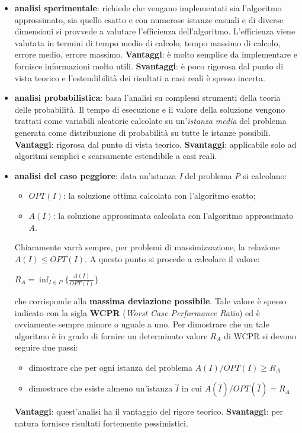 \documentclass[11pt, oneside]{book}
\begin{document}
\begin{itemize}
\item {\bf analisi sperimentale}: richiede che vengano implementati
  sia l'algoritmo approssimato, sia quello esatto e con numerose
  istanze casuali e di diverse dimensioni si provvede a valutare
  l'efficienza dell'algoritmo. L'efficienza viene valutata in termini
  di tempo medio di calcolo, tempo massimo di calcolo, errore medio,
  errore massimo. {\bf Vantaggi}: \`e molto semplice da implementare e
  fornisce informazioni molto utili. {\bf Svantaggi}: \`e poco
  rigorosa dal punto di vista teorico e l'estendibilit\`a dei
  risultati a casi reali \`e spesso incerta.

\item {\bf analisi probabilistica}: basa l'analisi su complessi
  strumenti della teoria delle probabilit\`a. Il tempo di esecuzione e
  il valore della soluzione vengono trattati come variabili aleatorie
  calcolate su un'{\em istanza media} del problema generata come
  distribuzione di probabilit\`a su tutte le istanze possibili. {\bf
    Vantaggi}: rigorosa dal punto di vista teorico. {\bf Svantaggi}:
  applicabile solo ad algoritmi semplici e scarsamente estendibile a
  casi reali.

\item {\bf analisi del caso peggiore}: data un'istanza {\em I}
  del problema {\em P} si calcolano:
  \begin{itemize}
  \item $OPT(I)$: la soluzione ottima calcolata con l'algoritmo
    esatto;
  \item $A(I)$: la soluzione approssimata calcolata con l'algoritmo
    approssimato {\em A}.
  \end{itemize}

  Chiaramente varr\`a sempre, per problemi di massimizzazione, la
  relazione $A(I) \leq OPT(I)$.  A questo punto si procede a calcolare
  il valore:

  \begin{center}
  $R_A = \inf_{I \in P} \bigr \{ \frac{A(I)}{OPT(I)} \bigr \}$
  \end{center}
 
  che corrisponde alla {\bf massima deviazione possibile}. Tale valore
  \`e spesso indicato con la sigla {\bf WCPR} ({\em Worst Case
    Performance Ratio}) ed \`e ovviamente sempre minore o uguale a
  uno. Per dimostrare che un tale algoritmo \`e in grado di fornire un
  determinato valore $R_A$ di WCPR si devono seguire due passi:

  \begin{itemize}
  \item dimostrare che per ogni istanza del problema $A(I)/OPT(I) \geq
    R_A$
  \item dimostrare che esiste almeno un'istanza $\hat{I}$ in cui
    $A(\hat{I})/OPT(\hat{I}) = R_A$ 
  \end{itemize}

  {\bf Vantaggi}: quest'analisi ha il vantaggio del rigore
  teorico. {\bf Svantaggi}: per natura fornisce risultati fortemente
  pessimistici.


\end{itemize}
\end{document}
